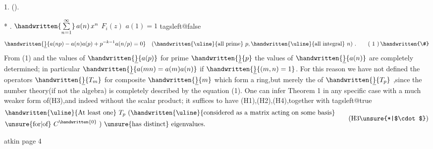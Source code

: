  1. ().

*  .  $\handwritten{\sum\limits_{n=1}^{\infty}}\,a(n)\,x^{n}$  $F_i(z)$  $a(1)=1$ 
\csname tagsleft@false\endcsname
\[
\handwritten{\underline}{a(np)-a(n)a(p)+p^{-k-1}a(n/p)=0}\quad
(\text{\handwritten{\uline}{all prime} }p,\text{\handwritten{\uline}{all integral} }n)\ .
\tag*{( 1 )\,\handwritten{\#}}
\]
From (1) and the values of $\handwritten{\underline}{a(p)}$ for prime $\handwritten{\underline}{p}$ the values of $\handwritten{\underline}{a(n)}$ are completely determined; in particular $\handwritten{\underline}{a(mn)=a(m)a(n)}$ if $\handwritten{\underline}{(m,n)=1}$. For this reason we have not defined the operators $\handwritten{\underline}{T_m}$ for composite $\handwritten{\underline}{m}$ which form a ring,but merely the  of $\handwritten{\underline}{T_p}$ ,since the number theory(if not the algebra) is completely described by the equation (1). One can infer Theorem 1 in any specific case with a much weaker form of(H3),and indeed without the scalar product; it suffices to have (H1),(H2),(H4),together with
\csname tagsleft@true\endcsname
\[
\begin{aligned}
&\text{\handwritten{\uline}{At least one} } T_p\ \text{(\handwritten{\uline}{considered as a matrix acting on some basis}}\\
&\text{\unsure{for|of} } C^{\handwritten{0}}\text{ ) \unsure{has distinct} eigenvalues.}
\end{aligned}
\tag*{(H3\unsure{*|$\cdot$})}
\]
\endgroup


\begin{center}atkin page 4\end{center}

